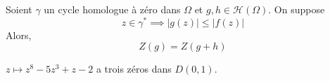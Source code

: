 	\begin{application}
		Soient $\gamma$ un cycle homologue à zéro dans $\Omega$ et $g, h \in \mathcal{H}(\Omega)$. On suppose
		\[ z \in \gamma^* \implies \vert g(z) \vert \leq \vert f(z) \vert \]
		Alors,
		\[ Z(g) = Z(g + h) \]
	\end{application}


	\begin{example}
		$z \mapsto z^8 - 5z^3 + z - 2$ a trois zéros dans $D(0,1)$.
	\end{example}


